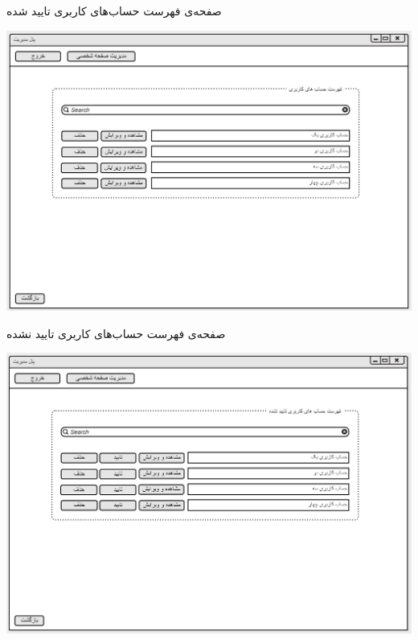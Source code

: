 \newpage
\vspace{1cm}
صفحه‌ی فهرست حساب‌های کاربری تایید شده
\begin{center}
\includegraphics[width=\textwidth]{Prototype/HeadManager/VerifiedAccountsList.png}
\end{center}

\vspace{1cm}
صفحه‌ی فهرست حساب‌های کاربری تایید نشده
\begin{center}
\includegraphics[width=\textwidth]{Prototype/HeadManager/UnverifiedAccountsList.png}
\end{center}

